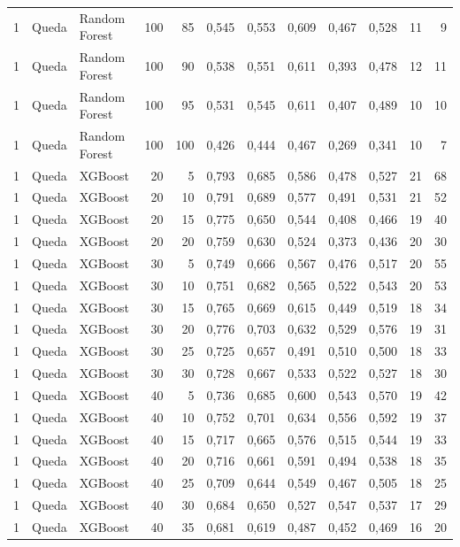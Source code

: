 \begin{longtable}{@{}rllrrrrrrrrr@{}}
1 & Queda & Random Forest & 100 & 85 & 0,545 & 0,553 & 0,609 & 0,467 & 0,528 & 11 & 9 \\
1 & Queda & Random Forest & 100 & 90 & 0,538 & 0,551 & 0,611 & 0,393 & 0,478 & 12 & 11 \\
1 & Queda & Random Forest & 100 & 95 & 0,531 & 0,545 & 0,611 & 0,407 & 0,489 & 10 & 10 \\
1 & Queda & Random Forest & 100 & 100 & 0,426 & 0,444 & 0,467 & 0,269 & 0,341 & 10 & 7 \\
1 & Queda & XGBoost & 20 & 5 & 0,793 & 0,685 & 0,586 & 0,478 & 0,527 & 21 & 68 \\
1 & Queda & XGBoost & 20 & 10 & 0,791 & 0,689 & 0,577 & 0,491 & 0,531 & 21 & 52 \\
1 & Queda & XGBoost & 20 & 15 & 0,775 & 0,650 & 0,544 & 0,408 & 0,466 & 19 & 40 \\
1 & Queda & XGBoost & 20 & 20 & 0,759 & 0,630 & 0,524 & 0,373 & 0,436 & 20 & 30 \\
1 & Queda & XGBoost & 30 & 5 & 0,749 & 0,666 & 0,567 & 0,476 & 0,517 & 20 & 55 \\
1 & Queda & XGBoost & 30 & 10 & 0,751 & 0,682 & 0,565 & 0,522 & 0,543 & 20 & 53 \\
1 & Queda & XGBoost & 30 & 15 & 0,765 & 0,669 & 0,615 & 0,449 & 0,519 & 18 & 34 \\
1 & Queda & XGBoost & 30 & 20 & 0,776 & 0,703 & 0,632 & 0,529 & 0,576 & 19 & 31 \\
1 & Queda & XGBoost & 30 & 25 & 0,725 & 0,657 & 0,491 & 0,510 & 0,500 & 18 & 33 \\
1 & Queda & XGBoost & 30 & 30 & 0,728 & 0,667 & 0,533 & 0,522 & 0,527 & 18 & 30 \\
1 & Queda & XGBoost & 40 & 5 & 0,736 & 0,685 & 0,600 & 0,543 & 0,570 & 19 & 42 \\
1 & Queda & XGBoost & 40 & 10 & 0,752 & 0,701 & 0,634 & 0,556 & 0,592 & 19 & 37 \\
1 & Queda & XGBoost & 40 & 15 & 0,717 & 0,665 & 0,576 & 0,515 & 0,544 & 19 & 33 \\
1 & Queda & XGBoost & 40 & 20 & 0,716 & 0,661 & 0,591 & 0,494 & 0,538 & 18 & 35 \\
1 & Queda & XGBoost & 40 & 25 & 0,709 & 0,644 & 0,549 & 0,467 & 0,505 & 18 & 25 \\
1 & Queda & XGBoost & 40 & 30 & 0,684 & 0,650 & 0,527 & 0,547 & 0,537 & 17 & 29 \\
1 & Queda & XGBoost & 40 & 35 & 0,681 & 0,619 & 0,487 & 0,452 & 0,469 & 16 & 20 \\

\end{longtable}
